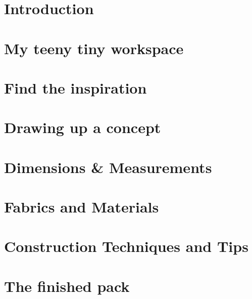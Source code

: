 \chapter{Introduction} \label{chap:intro}


\chapter{My teeny tiny workspace} \label{chap:workspace}


\chapter{Find the inspiration} \label{chap:inspiration}


\chapter{Drawing up a concept} \label{chap:drawing}


\chapter{Dimensions \& Measurements}\label{chap:dimensions}


\chapter{Fabrics and Materials} \label{chap:materials}


\chapter{Construction Techniques and Tips} \label{chap:techniques}


\chapter{The finished pack} \label{chap:pack}

